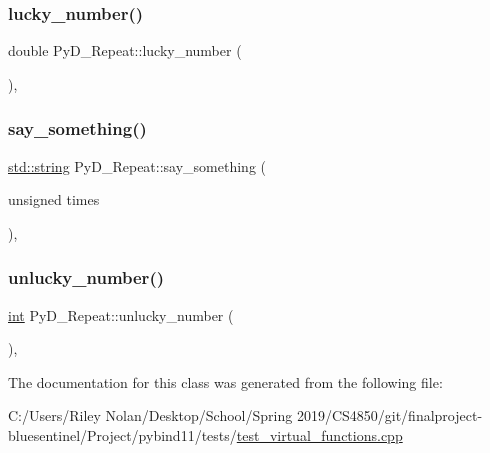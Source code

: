 \subsubsection{\texorpdfstring{lucky\_number()}{lucky\_number()}}
{\footnotesize\ttfamily double Py\+D\+\_\+\+Repeat\+::lucky\+\_\+number (\begin{DoxyParamCaption}{ }\end{DoxyParamCaption})\hspace{0.3cm}{\ttfamily [inline]}, {\ttfamily [override]}}

\mbox{\label{class_py_d___repeat_ac308065a93487157a41032bf96c13d64}} 
\subsubsection{\texorpdfstring{say\_something()}{say\_something()}}
{\footnotesize\ttfamily \mbox{\hyperlink{_s_d_l__opengl__glext_8h_ab4ccfaa8ab0e1afaae94dc96ef52dde1}{std\+::string}} Py\+D\+\_\+\+Repeat\+::say\+\_\+something (\begin{DoxyParamCaption}\item[{unsigned}]{times }\end{DoxyParamCaption})\hspace{0.3cm}{\ttfamily [inline]}, {\ttfamily [override]}}

\mbox{\label{class_py_d___repeat_adcceabf90f371185b70cc1d81286b127}} 
\subsubsection{\texorpdfstring{unlucky\_number()}{unlucky\_number()}}
{\footnotesize\ttfamily \mbox{\hyperlink{warnings_8h_a74f207b5aa4ba51c3a2ad59b219a423b}{int}} Py\+D\+\_\+\+Repeat\+::unlucky\+\_\+number (\begin{DoxyParamCaption}{ }\end{DoxyParamCaption})\hspace{0.3cm}{\ttfamily [inline]}, {\ttfamily [override]}}



The documentation for this class was generated from the following file\+:\begin{DoxyCompactItemize}
\item 
C\+:/\+Users/\+Riley Nolan/\+Desktop/\+School/\+Spring 2019/\+C\+S4850/git/finalproject-\/bluesentinel/\+Project/pybind11/tests/\mbox{\hyperlink{test__virtual__functions_8cpp}{test\+\_\+virtual\+\_\+functions.\+cpp}}\end{DoxyCompactItemize}
